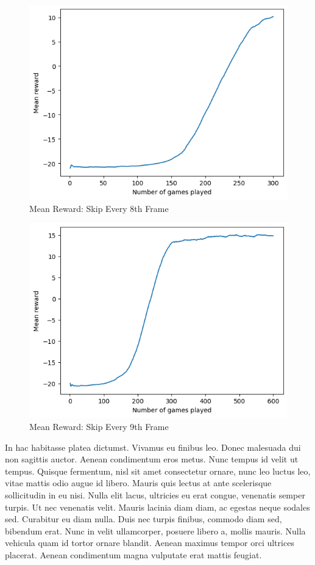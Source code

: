 \documentclass[12pt, a4paper, twocolumn]{article} %
\begin{document}
\begin{figure}[H]
	\includegraphics[width=\linewidth]{mr_sk8.PNG} %
	\caption{Mean Reward: Skip Every 8th Frame} %
\end{figure}

\begin{figure}[H]
	\includegraphics[width=\linewidth]{mr_sk9.PNG} %
	\caption{Mean Reward: Skip Every 9th Frame} %
\end{figure}

In hac habitasse platea dictumst. Vivamus eu finibus leo. Donec malesuada dui non sagittis auctor. Aenean condimentum eros metus. Nunc tempus id velit ut tempus. Quisque fermentum, nisl sit amet consectetur ornare, nunc leo luctus leo, vitae mattis odio augue id libero. Mauris quis lectus at ante scelerisque sollicitudin in eu nisi. Nulla elit lacus, ultricies eu erat congue, venenatis semper turpis. Ut nec venenatis velit. Mauris lacinia diam diam, ac egestas neque sodales sed. Curabitur eu diam nulla. Duis nec turpis finibus, commodo diam sed, bibendum erat. Nunc in velit ullamcorper, posuere libero a, mollis mauris. Nulla vehicula quam id tortor ornare blandit. Aenean maximus tempor orci ultrices placerat. Aenean condimentum magna vulputate erat mattis feugiat.
\end{document}
